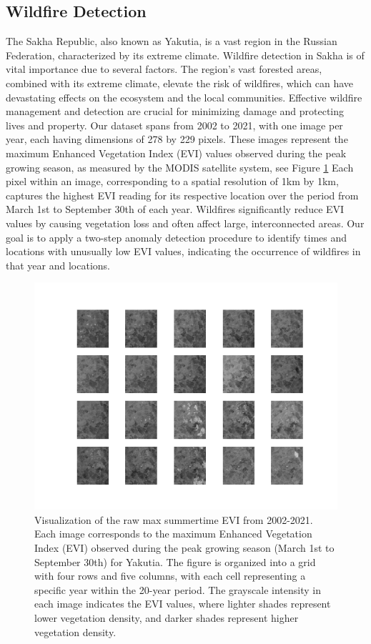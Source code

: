 \documentclass[11pt]{article}
\begin{document}
\subsection{Wildfire Detection}
The Sakha Republic, also known as Yakutia, is a vast region in the Russian Federation, characterized by its extreme climate. Wildfire detection in Sakha is of vital importance due to several factors. The region's vast forested areas, combined with its extreme climate, elevate the risk of wildfires, which can have devastating effects on the ecosystem and the local communities. Effective wildfire management and detection are crucial for minimizing damage and protecting lives and property. Our dataset spans from 2002 to 2021, with one image per year, each having dimensions of 278 by 229 pixels. These images represent the maximum Enhanced Vegetation Index (EVI) values observed during the peak growing season, as measured by the MODIS satellite system, see Figure \ref{fig: real data} Each pixel within an image, corresponding to a spatial resolution of 1km by 1km, captures the highest EVI reading for its respective location over the period from March 1st to September 30th of each year. Wildfires significantly reduce EVI values by causing vegetation loss and often affect large, interconnected areas. Our goal is to apply a two-step anomaly detection procedure to identify times and locations with unusually low EVI values, indicating the occurrence of wildfires in that year and locations.

\begin{figure}[h!]
    \centering
    \includegraphics[width=\textwidth]{../figure/raw_data}
    \caption{Visualization of the raw max summertime EVI from 2002-2021. Each image corresponds to the maximum Enhanced Vegetation Index (EVI) observed during the peak growing season (March 1st to September 30th) for Yakutia. The figure is organized into a grid with four rows and five columns, with each cell representing a specific year within the 20-year period. The grayscale intensity in each image indicates the EVI values, where lighter shades represent lower vegetation density, and darker shades represent higher vegetation density.}
    \label{fig: real data}
\end{figure}
\end{document}

